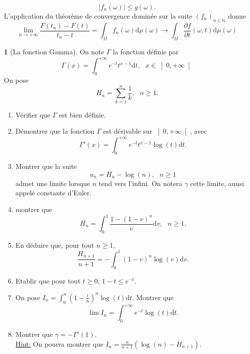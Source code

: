 \documentclass[8pt,notheorems]{beamer}
\def \N{\mathbb N}
\def \Om{\Omega}
\def \om{\omega}
\theoremstyle{definition}
\theoremstyle{example}
\newtheorem{example}{\translate{Exemple}}
\theoremstyle{mystyle}
\theoremstyle{plain}
\begin{document}
\begin{frame}[allowframebreaks]
$$
|f_n(\om)|\leq g(\om).
$$
L'application du théorème de convergence dominée sur la suite $(f_n)_{n\in\N}$ donne
$$
\underset{n\rightarrow+\infty}{\lim}\frac{F(t_n)-F(t)}{t_n-t}=\int_{\Om} f_n(\om)\text{d}\mu
(\om)\rightarrow \int_{\Om} \frac{\partial f}{\partial t}(\om,t)\text{d}\mu(\om)
$$
\begin{example}[La fonction Gamma]
On note $\Gamma$ la fonction définie par
$$
\Gamma(x)=\int_{0}^{+\infty}e^{-t}t^{x-1}\text{d}t,\text{ }x\in\left]0,+\infty\right[
$$
On pose
$$
H_n=\sum_{k=1}^{n}\frac{1}{k},\text{ }n\geq1.
$$
\end{example}
\begin{enumerate}
\item Vérifier que $\Gamma$ est bien définie.
\item Démontrer que la fonction $\Gamma$ est dérivable sur $\left]0,+\infty\right[$, avec
$$
\Gamma'(x)=\int_{0}^{+\infty}e^{-t}t^{x-1}\log(t)\text{d}t.
$$
\item Montrer que la suite
$$
u_n=H_n-\log(n),\text{ }n\geq 1
$$
admet une limite lorsque $n$ tend vers l'infini. On notera $\gamma$ cette limite, auusi appelé constante d'Euler.
\item montrer que
$$
H_n=\int_{0}^{1}\frac{1-(1-v)^{n}}{v}\text{d}v,\text{ }n\geq1.
$$
\item En déduire que, pour tout $n\geq 1$,
$$
\frac{H_{n+1}}{n+1}=-\int_{0}^{1}(1-v)^{n}\log(v)\text{d}v.
$$
\item Etablir que pour tout $t\geq 0$, $1-t\leq e^{-t}$.
\item On pose $I_n=\int_{0}^{n}\left(1-\frac{t}{n}\right)^{n}\log(t)\text{d}t$. Montrer que
$$
\lim I_n =\int_{0}^{+\infty}e^{-t}\log(t)\text{d}t.
$$
\item Montrer que $\gamma=-\Gamma'(1)$.\\
\underline{Hint:} On pourra montrer que $I_n=\frac{n}{n+1}(\log(n)-H_{n+1})$.
\end{enumerate}
\end{frame}
\end{document}
